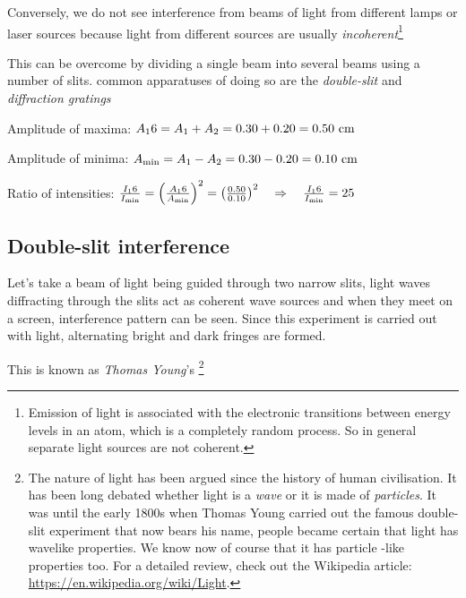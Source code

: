 Conversely, we do not see interference from beams of light from different lamps or laser sources because light from different sources are usually \emph{incoherent}\footnote{Emission of light is associated with the electronic transitions between energy levels in an atom, which is a completely random process. So in general separate light sources are not coherent.}

This can be overcome by dividing a single beam into several beams using a number of slits. common apparatuses of doing so are the \emph{double-slit} and \emph{diffraction gratings}


\begin{soln} Amplitude of maxima: $A_16 = A_1 + A_2 = 0.30 + 0.20 = 0.50 \text{ cm}$

Amplitude of minima: $A_{\text{min}} = A_1 - A_2 = 0.30 - 0.20 = 0.10 \text{ cm}$

Ratio of intensities: $\frac{I_16}{I_{\text{min}}} = \left( \frac{A_16}{A_{\text{min}}} \right)^2 = \left( \frac{0.50}{0.10} \right)^2 \quad \Rightarrow \quad \frac{I_16}{I_{\text{min}}} = 25$ \end{soln}



\newpage


\subsection{Double-slit interference}

Let's take a beam of light being guided through two narrow slits, light waves diffracting through the slits act as coherent wave sources and when they meet on a screen, interference pattern can be seen. Since this experiment is carried out with light, alternating bright and dark fringes are formed. 

This is known as \emph{Thomas Young}'s 
\footnote[][-4cm]{The nature of light has been argued since the history of human civilisation. It has been long debated whether light is a \emph{wave} or it is made of \emph{particles}. It was until the early 1800s when Thomas Young carried out the famous double-slit experiment that now bears his name, people became certain that light has wavelike properties. We know now of course that it has particle -like properties too. For a detailed review, check out the Wikipedia article: \url{https://en.wikipedia.org/wiki/Light}.}



